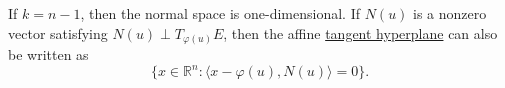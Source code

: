 	If $k=n-1$, then the normal space is one-dimensional. If $N(u)$ is a nonzero vector satisfying $N(u) \perp T_{\varphi(u)}E$, then the affine \hyperref[def:tangent-hyperplane]{tangent hyperplane} can also be written as
	\begin{equation}
		\{x \in \mathbb{R}^n : \langle x - \varphi(u), N(u) \rangle = 0\}.
	\end{equation}

	\begin{example}
	  \label{ex:tangent-space-of-curve-in-r2}
	  
	\end{example}

	\begin{example}
	  \label{ex:tangent-space-of-curve-in-r3}
	  
	\end{example}


